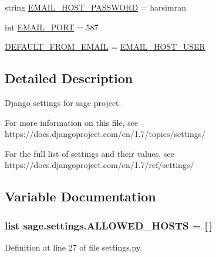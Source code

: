 \begin{DoxyCompactItemize}
\item 
string \hyperlink{namespacesage_1_1settings_a66e7a16ed6b0df5716a6579fcba949a6}{E\+M\+A\+I\+L\+\_\+\+H\+O\+S\+T\+\_\+\+P\+A\+S\+S\+W\+O\+R\+D} = \textquotesingle{}harsimran\textquotesingle{}
\item 
int \hyperlink{namespacesage_1_1settings_a3fe927460bba6408b5df39fa8a10d367}{E\+M\+A\+I\+L\+\_\+\+P\+O\+R\+T} = 587
\item 
\hyperlink{namespacesage_1_1settings_a6517c4f93850d63e2bdbe7040ad0e2ff}{D\+E\+F\+A\+U\+L\+T\+\_\+\+F\+R\+O\+M\+\_\+\+E\+M\+A\+I\+L} = \hyperlink{namespacesage_1_1settings_a9c01855359753a3c3f517341806347c2}{E\+M\+A\+I\+L\+\_\+\+H\+O\+S\+T\+\_\+\+U\+S\+E\+R}
\end{DoxyCompactItemize}


\subsection{Detailed Description}
\begin{DoxyVerb}Django settings for sage project.

For more information on this file, see
https://docs.djangoproject.com/en/1.7/topics/settings/

For the full list of settings and their values, see
https://docs.djangoproject.com/en/1.7/ref/settings/
\end{DoxyVerb}
 

\subsection{Variable Documentation}
\hypertarget{namespacesage_1_1settings_a2eb98def792cf73bbc5884024afc5602}{}
\subsubsection[{A\+L\+L\+O\+W\+E\+D\+\_\+\+H\+O\+S\+T\+S}]{\setlength{\rightskip}{0pt plus 5cm}list sage.\+settings.\+A\+L\+L\+O\+W\+E\+D\+\_\+\+H\+O\+S\+T\+S = \mbox{[}$\,$\mbox{]}}\label{namespacesage_1_1settings_a2eb98def792cf73bbc5884024afc5602}


Definition at line 27 of file settings.\+py.

\hypertarget{namespacesage_1_1settings_add6d83672b1137d74a06bf1606aecf04}{}
